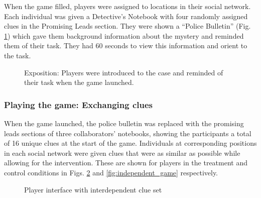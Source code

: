 \documentclass{article}
\begin{document}
When the game filled, players were assigned to locations in their social network. Each individual was given a Detective’s Notebook with four randomly assigned clues in the Promising Leads section. They were shown a “Police Bulletin” (Fig. \ref{fig:exposition}) which gave them background information about the mystery and reminded them of their task. They had 60 seconds to view this information and orient to the task.

\begin{figure}[h!]
\centering
{}
\caption{Exposition: Players were introduced to the case and reminded of their task when the game launched.}
\label{fig:exposition}
\end{figure}

\subsubsection{Playing the game: Exchanging clues}
When the game launched, the police bulletin was replaced with the promising leads sections of three collaborators’ notebooks, showing the participants a total of 16 unique clues at the start of the game. Individuals at corresponding positions in each social network were given clues that were as similar as possible while allowing for the intervention. These are shown for players in the treatment and control conditions in Figs. \ref{fig:interdependent_game} and \ref{fig:independent_game} respectively.

\begin{figure}[h!]
\centering
{}
\caption{Player interface with interdependent clue set}
\label{fig:interdependent_game}
\end{figure}
\end{document}
